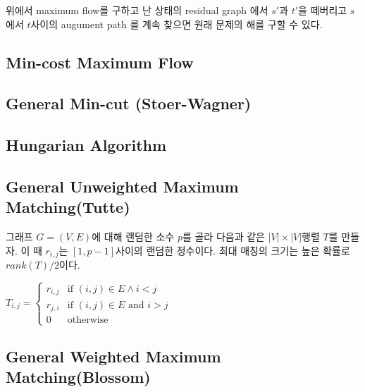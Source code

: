 \documentclass[9pt,landscape,a4paper,twocolumn]{extarticle}
\begin{document}
위에서 maximum flow를 구하고 난 상태의 residual graph 에서 $s'$과 $t'$을 떼버리고 $s$에서 $t$사이의 augument path 를 계속 찾으면 원래 문제의 해를 구할 수 있다.



\subsection{Min-cost Maximum Flow}


\subsection{General Min-cut (Stoer-Wagner)}


\subsection{Hungarian Algorithm}


\subsection{General Unweighted Maximum Matching(Tutte)}
그래프 $G=(V,E)$에 대해 랜덤한 소수 $p$를 골라 다음과 같은 $|V| \times |V|$행렬 $T$를 만들자. 이 때 $r_{i,j}$는 $[1,p-1]$사이의 랜덤한 정수이다.
최대 매칭의 크기는 높은 확률로 $rank(T)/2$이다.

$T_{i,j} = \begin{cases} r_{i,j} & \text{if } (i,j) \in E \land i < j
    \\ r_{j,i} & \text{if } (i,j) \in E \text{ and } i > j
    \\ 0 & \text{otherwise} \end{cases}$

\subsection{General Weighted Maximum Matching(Blossom)}


% 
\end{document}
